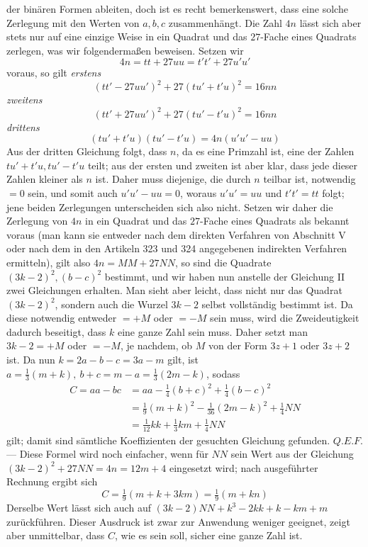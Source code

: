 der binären Formen ableiten, doch ist es recht bemerkenswert, dass eine solche Zerlegung mit den Werten von \(a,\allowbreak b,\allowbreak c\) zusammenhängt. Die Zahl \(4n\) lässt sich aber stets nur auf eine einzige Weise in ein Quadrat und das \(27\)-Fache eines Quadrats zerlegen, was wir folgendermaßen beweisen. Setzen wir \[4n=tt+27uu=t't'+27u'u'\] voraus, so gilt \textit{erstens} \[(tt'-27uu')^2+27(tu'+t'u)^2=16nn\] \textit{zweitens} \[(tt'+27uu')^2+27(tu'-t'u)^2=16nn\] \textit{drittens} \[(tu'+t'u)(tu'-t'u)=4n(u'u'-uu)\] Aus der dritten Gleichung folgt, dass \(n\), da es eine Primzahl ist, eine der Zahlen \(tu'+t'u,\allowbreak tu'-t'u\) teilt; aus der ersten und zweiten ist aber klar, dass jede dieser Zahlen kleiner als \(n\) ist. Daher muss diejenige, die durch \(n\) teilbar ist, notwendig \(=0\) sein, und somit auch \(u'u'-uu=0\), woraus \(u'u'=uu\) und \(t't'=tt\) folgt; jene beiden Zerlegungen unterscheiden sich also nicht. Setzen wir daher die Zerlegung von \(4n\) in ein Quadrat und das \(27\)-Fache eines Quadrats als bekannt voraus (man kann sie entweder nach dem direkten Verfahren von Abschnitt V oder nach dem in den Artikeln 323 und 324 angegebenen indirekten Verfahren ermitteln), gilt also \(4n=MM+27NN\), so sind die Quadrate \((3k-2)^2,\allowbreak (b-c)^2\) bestimmt, und wir haben nun anstelle der Gleichung II zwei Gleichungen erhalten. Man sieht aber leicht, dass nicht nur das Quadrat \((3k-2)^2\), sondern auch die Wurzel \(3k-2\) selbst vollständig bestimmt ist. Da diese notwendig entweder \(=+M\) oder \(=-M\) sein muss, wird die Zweideutigkeit dadurch beseitigt, dass \(k\) eine ganze Zahl sein muss. Daher setzt man \(3k-2=+M\) oder \(=-M\), je nachdem, ob \(M\) von der Form \(3z+1\) oder \(3z+2\) ist. Da nun \(k=2a-b-c=3a-m\) gilt, ist \(a=\frac13(m+k),\allowbreak \ b+c=m-a=\frac13(2m-k)\), sodass \[\begin{aligned}C=aa-bc&=aa-\tfrac14(b+c)^2+\tfrac14(b-c)^2\\&=\tfrac19(m+k)^2-\tfrac1{36}(2m-k)^2+\tfrac14NN\\&=\tfrac1{12}kk+\tfrac13km+\tfrac14NN\end{aligned}\] gilt; damit sind sämtliche Koeffizienten der gesuchten Gleichung gefunden. \(Q.E.F.\) — Diese Formel
wird noch einfacher, wenn für \(NN\) sein Wert aus der Gleichung \((3k-2)^2+27NN=4n=12m+4\) eingesetzt wird; nach ausgeführter Rechnung ergibt sich \[C=\tfrac19(m+k+3km)=\tfrac19(m+kn)\] Derselbe Wert lässt sich auch auf \((3k-2)NN+k^3-2kk+k-km+m\) zurückführen. Dieser Ausdruck ist zwar zur Anwendung weniger geeignet, zeigt aber unmittelbar, dass \(C\), wie es sein soll, sicher eine ganze Zahl ist.

